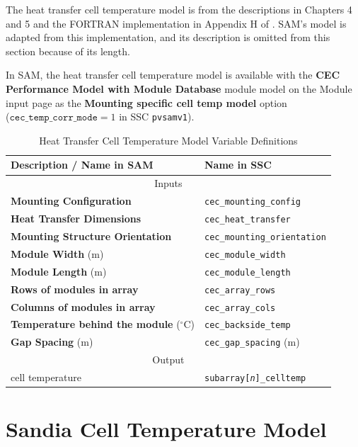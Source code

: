 \documentclass[12pt,letterpaper]{article}
\begin{document}
The heat transfer cell temperature model is from the descriptions in Chapters 4 and 5 and the FORTRAN implementation in Appendix H of \citet{neises2011}. SAM's model is adapted from this implementation, and its description is omitted from this section because of its length.

In SAM, the heat transfer cell temperature model is available with the \textbf{CEC Performance Model with Module Database} module model on the Module input page as the \textbf{Mounting specific cell temp model} option\\($\mathtt{cec\_temp\_corr\_mode}=1$ in SSC \texttt{pvsamv1}).

\begin{table}
\begin{center}
\caption{Heat Transfer Cell Temperature Model Variable Definitions}
\begin{tabular}{ll}
\midrule
Description / \textbf{Name in SAM} & Name in SSC \\
\midrule
\multicolumn{2}{c}{Inputs}\\
\textbf{Mounting Configuration} & \texttt{cec\_mounting\_config} \\ 
\textbf{Heat Transfer Dimensions} & \texttt{cec\_heat\_transfer} \\ 
\textbf{Mounting Structure Orientation} & \texttt{cec\_mounting\_orientation} \\ 
\textbf{Module Width} (m)& \texttt{cec\_module\_width} \\ 
\textbf{Module Length} (m)& \texttt{cec\_module\_length} \\ 
\textbf{Rows of modules in array} & \texttt{cec\_array\_rows} \\ 
\textbf{Columns of modules in array} & \texttt{cec\_array\_cols} \\ 
\textbf{Temperature behind the module} ($^\circ$C) & \texttt{cec\_backside\_temp} \\ 
\textbf{Gap Spacing} (m)& \texttt{cec\_gap\_spacing} (m) \\ 
\midrule
\multicolumn{2}{c}{Output}\\
cell temperature & \texttt{subarray[\textit{n}]\_celltemp} \\
\hline
\end{tabular}
\label{tab-tempheattransfer}
\end{center}
\end{table}

\section{Sandia Cell Temperature Model}\label{sec-tcsandia}
\end{document}
